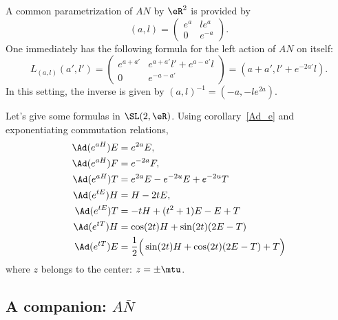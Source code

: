 A common parametrization of $AN$ by $\eR^2$ is provided by
\begin{equation}   \label{EqParmalSL}
	(a,l)=
	\begin{pmatrix}
		e^a & le^a   \\
		0   & e^{-a}
	\end{pmatrix}.
\end{equation}
One immediately has the following formula for the left action of $AN$ on itself:
\[
	L_{(a,l)}(a',l')=\begin{pmatrix}
		e^{a+a'} & e^{a+a'}l'+e^{a-a'}l \\
		0        & e^{-a-a'}
	\end{pmatrix}=(a+a',l'+e^{-2a'}l).
\]
In this setting, the inverse is given by $(a,l)^{-1}=(-a,-l e^{2a})$.

Let's give some formulas in $\SL(2,\eR)$. Using corollary~\ref{Ad_e} and exponentiating commutation relations,
\begin{subequations}  \label{eq_eaHsldr}
	\begin{align}
		\Ad(e^{aH})E  & =e^{2a}E,                                            \\
		\Ad(e^{aH})F  & =e^{-2a}F,                                           \\
		\Ad( e^{aH})T & = e^{2a}E- e^{-2u}E+ e^{-2u}T                        \\
		\Ad(e^{tE})H  & =H-2tE,                            \label{eq_AdetE}  \\
		\Ad( e^{tE})T & =-tH+(t^2+1)E-E+T                                    \\
		\Ad( e^{tT})H & =\cos(2t)H+\sin(2t)(2E-T)                            \\
		\Ad( e^{tT})E & =\frac{ 1 }{2}\Big( \sin(2t)H+\cos(2t)(2E-T)+T \Big)
	\end{align}
\end{subequations}
where $z$ belongs to the center: $z=\pm\mtu$.

\subsection{A companion: \texorpdfstring{$A\bar N$}{AN}}


